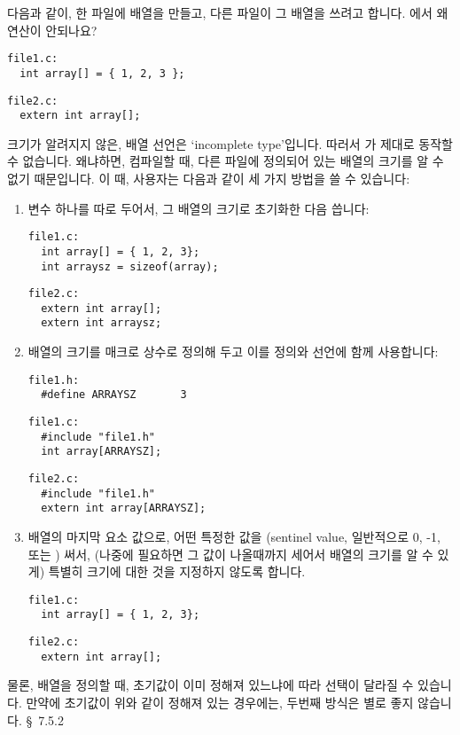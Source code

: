 \begin{faq}
        다음과 같이, 한 파일에  배열을 만들고, 다른 파일이 그
        배열을 쓰려고 합니다. 에서 왜  연산이 안되나요?
\begin{verbatim}
file1.c:
  int array[] = { 1, 2, 3 };
\end{verbatim}

\begin{verbatim}
file2.c:
  extern int array[];
\end{verbatim}
      
\A
        크기가 알려지지 않은,  배열 선언은 `incomplete type'입니다.
        따러서 가 제대로 동작할 수 없습니다. 왜냐하면, 컴파일할 때,
        다른 파일에 정의되어 있는 배열의 크기를 알 수 없기 때문입니다. 이 때,
        사용자는 다음과 같이 세 가지 방법을 쓸 수 있습니다:
\begin{enumerate}
        \item 변수 하나를 따로 두어서, 그 배열의 크기로 초기화한 다음 씁니다:
\begin{verbatim}
file1.c:
  int array[] = { 1, 2, 3};
  int arraysz = sizeof(array);
\end{verbatim}

\begin{verbatim}
file2.c:
  extern int array[];
  extern int arraysz;
\end{verbatim}

        \item 배열의 크기를 매크로 상수로 정의해 두고 이를 정의와 
          선언에 함께 사용합니다:
\begin{verbatim}
file1.h:
  #define ARRAYSZ       3
\end{verbatim}
\begin{verbatim}
file1.c:
  #include "file1.h"
  int array[ARRAYSZ];
\end{verbatim}
\begin{verbatim}
file2.c:
  #include "file1.h"
  extern int array[ARRAYSZ];
\end{verbatim}
        \item 배열의 마지막 요소 값으로, 어떤 특정한 값을 (sentinel
          value, 일반적으로 0, -1, 또는 ) 써서, (나중에 필요하면
          그 값이 나올때까지 세어서 배열의 크기를 알 수 있게) 특별히 크기에
          대한 것을 지정하지 않도록 합니다.
\begin{verbatim}
file1.c:
  int array[] = { 1, 2, 3};
\end{verbatim}

\begin{verbatim}
file2.c:
  extern int array[];
\end{verbatim}
\end{enumerate}
        물론, 배열을 정의할 때, 초기값이 이미 정해져 있느냐에 따라 
        선택이 달라질 수 있습니다.  만약에 초기값이 위와 같이 정해져 있는
        경우에는, 두번째 방식은 별로 좋지 않습니다.
\R
        \cite{hs} \S\ 7.5.2 
\end{faq}

